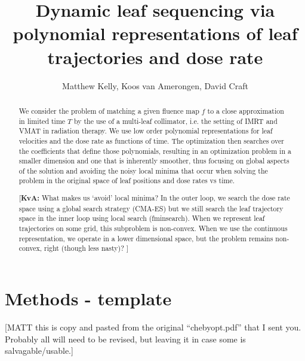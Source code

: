 \documentclass[12pt]{article}
\title{Dynamic leaf sequencing via polynomial representations of leaf trajectories and dose rate}
\author{Matthew Kelly, Koos van Amerongen, David Craft}
\affil[]{Department of Radiation Oncology, Massachusetts General Hospital, Harvard Medical School}
\newcommand{\KvAcomment}[1]{{\color{magenta}\par {[{\bf KvA: } { #1}} ] \\    }}
\begin{document}
\maketitle
\thispagestyle{empty}



\begin{abstract}
  We consider the problem of matching a given fluence map $f$ to a close approximation in limited time $T$ by the use of a multi-leaf collimator,
  i.e. the setting of IMRT and VMAT in radiation therapy.
  We use low order polynomial representations for leaf velocities and the dose rate as functions of time.
  The optimization then searches over the coefficients that define those polynomials, resulting in an optimization problem in a smaller dimension and one that is inherently smoother,
  thus focusing on global aspects of the solution and avoiding the noisy local minima that occur when solving the problem in the original space of leaf positions and dose rates vs time.
  \KvAcomment{What makes us `avoid' local minima? In the outer loop, we search the dose rate space using a global search strategy (CMA-ES) but we still search the leaf trajectory space in the inner loop using local search (fminsearch). When we represent leaf trajectories on some grid, this subproblem is non-convex. When we use the continuous representation, we operate in a lower dimensional space, but the problem remains non-convex, right (though less nasty)?}
\end{abstract}






\section{Methods - template}

[MATT this is copy and pasted from the original ``chebyopt.pdf'' that I sent you. Probably all will need to be revised, but leaving it in case some is salvagable/usable.]
\end{document}

